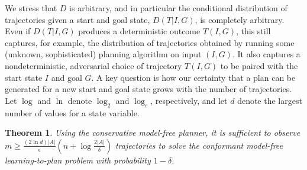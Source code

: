 \documentclass{article}
\newenvironment{proof}{\noindent{\bf Proof:~~}}{\qed}
\newcommand{\qed}{\hfill\ensuremath{\blacksquare}}
\newtheorem{theorem}{Theorem}
\newcommand{\MEMO}[1]
{ \fbox{
		\begin{minipage}[b]{7.9 cm}
			#1
		\end{minipage}
} }
\begin{document}
	We stress that $D$ is arbitrary, and in particular the conditional distribution
	of trajectories given a start and goal state, $D(T|I,G)$, is completely 
	arbitrary. Even if $D(T|I,G)$ produces a deterministic outcome $T(I,G)$, this
	still captures, for example, the distribution of trajectories obtained
	by running some (unknown, sophisticated) planning algorithm on input $(I,G)$.
	It also captures a nondeterministic, adversarial choice of trajectory $T(I,G)$ to 
	be paired with the start state $I$ and goal $G$. 
	A key question is how our certainty that a plan can be generated for a new start and goal state grows with the number of trajectories. Let $\log$ and $\ln$ denote $\log_2$ and $\log_e$, respectively, and let $d$ denote the largest number of values
	for a state variable. 
	\begin{theorem}
		Using the conservative model-free planner, 
		it is sufficient to observe 
		$m\geq\frac{(2\ln  d)|A|}{\epsilon}(n+\log\frac{2|A|}{\delta})$
		trajectories to solve the conformant model-free learning-to-plan problem with probability $1-\delta$. 
		\label{the:pac-conformant}
	\end{theorem}
\end{document}
